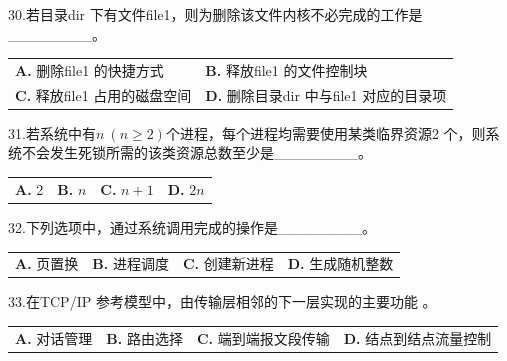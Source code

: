 \documentclass[UTF8,11pt]{ctexart}
\begin{document}
30.若目录dir 下有文件file1，则为删除该文件内核不必完成的工作是\_\_\_\_\_\_\_\_。


\begin{center}\begin{tabular}{>{\raggedright\arraybackslash}p{\dimexpr(\linewidth-4\tabcolsep)/2\relax}>{\raggedright\arraybackslash}p{\dimexpr(\linewidth-4\tabcolsep)/2\relax}}
\textbf{A.} 删除file1 的快捷方式 & \textbf{B.} 释放file1 的文件控制块\\[.35em]
\textbf{C.} 释放file1 占用的磁盘空间 & \textbf{D.} 删除目录dir 中与file1 对应的目录项\\[.35em]\end{tabular}\end{center}

31.若系统中有\(\displaystyle n\ (n\ge2)\)个进程，每个进程均需要使用某类临界资源2 个，则系统不会发生死锁所需的该类资源总数至少是\_\_\_\_\_\_\_\_。


\begin{center}\begin{tabular}{>{\raggedright\arraybackslash}p{\dimexpr(\linewidth-8\tabcolsep)/4\relax}>{\raggedright\arraybackslash}p{\dimexpr(\linewidth-8\tabcolsep)/4\relax}>{\raggedright\arraybackslash}p{\dimexpr(\linewidth-8\tabcolsep)/4\relax}>{\raggedright\arraybackslash}p{\dimexpr(\linewidth-8\tabcolsep)/4\relax}}
\textbf{A.} 2 & \textbf{B.} \(\displaystyle n\) & \textbf{C.} \(\displaystyle n+1\) & \textbf{D.} \(\displaystyle 2n\)\\[.35em]\end{tabular}\end{center}

32.下列选项中，通过系统调用完成的操作是\_\_\_\_\_\_\_\_。


\begin{center}\begin{tabular}{>{\raggedright\arraybackslash}p{\dimexpr(\linewidth-8\tabcolsep)/4\relax}>{\raggedright\arraybackslash}p{\dimexpr(\linewidth-8\tabcolsep)/4\relax}>{\raggedright\arraybackslash}p{\dimexpr(\linewidth-8\tabcolsep)/4\relax}>{\raggedright\arraybackslash}p{\dimexpr(\linewidth-8\tabcolsep)/4\relax}}
\textbf{A.} 页置换 & \textbf{B.} 进程调度 & \textbf{C.} 创建新进程 & \textbf{D.} 生成随机整数\\[.35em]\end{tabular}\end{center}

33.在TCP/IP 参考模型中，由传输层相邻的下一层实现的主要功能 。


\begin{center}\begin{tabular}{>{\raggedright\arraybackslash}p{\dimexpr(\linewidth-8\tabcolsep)/4\relax}>{\raggedright\arraybackslash}p{\dimexpr(\linewidth-8\tabcolsep)/4\relax}>{\raggedright\arraybackslash}p{\dimexpr(\linewidth-8\tabcolsep)/4\relax}>{\raggedright\arraybackslash}p{\dimexpr(\linewidth-8\tabcolsep)/4\relax}}
\textbf{A.} 对话管理 & \textbf{B.} 路由选择 & \textbf{C.} 端到端报文段传输 & \textbf{D.} 结点到结点流量控制\\[.35em]\end{tabular}\end{center}
\end{document}
